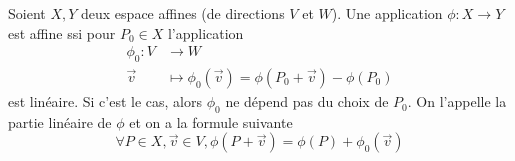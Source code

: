 \begin{theorem}
	Soient $X, Y$ deux espace affines (de directions $V$ et $W$). Une application
	$\phi: X \to Y$ est affine ssi pour $P_0 \in X$ l'application
	\begin{align*}
		\phi_0: V &\to W\\
		\vec{v} &\mapsto \phi_0(\vec{v}) = \phi(P_0 + \vec{v}) - \phi(P_0)	
	\end{align*}
	est linéaire. Si c'est le cas, alors $\phi_0$ ne dépend pas du choix de
	$P_0$. On l'appelle la partie linéaire de $\phi$ et on a la formule suivante
	\begin{equation*}
		\forall P\in X, \vec{v} \in V, \phi(P+\vec{v}) = \phi(P) + \phi_0(\vec{v})
	\end{equation*}
\end{theorem}

